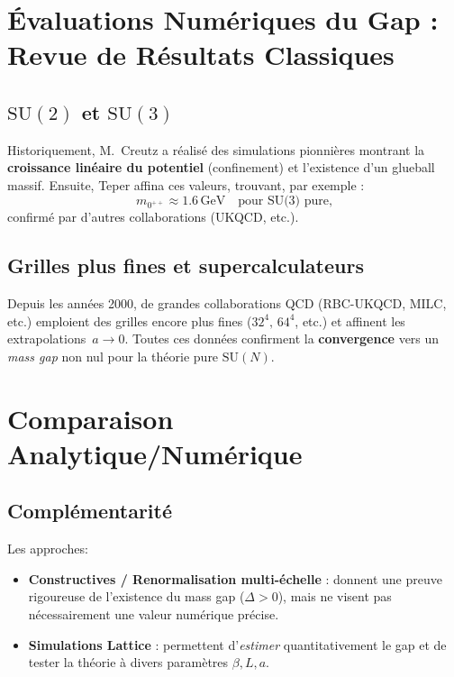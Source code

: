 \section{Évaluations Numériques du Gap : Revue de Résultats Classiques}
\label{sec:C.2}

\subsection*{\(\mathrm{SU}(2)\) et \(\mathrm{SU}(3)\)}
Historiquement, M.~Creutz \cite{Creutz1983} a réalisé des simulations
pionnières montrant la \textbf{croissance linéaire du potentiel} (confinement)
et l’existence d’un glueball massif. Ensuite, Teper \cite{Teper1998} affina
ces valeurs, trouvant, par exemple :
\[
m_{0^{++}} \approx 1.6 \,\mathrm{GeV} \quad \text{pour SU(3) pure,}
\]
confirmé par d’autres collaborations (UKQCD, etc.).

\subsection*{Grilles plus fines et supercalculateurs}
Depuis les années 2000, de grandes collaborations QCD (RBC-UKQCD, MILC, etc.)
emploient des grilles encore plus fines (\(32^4,\,64^4\), etc.) et affinent
les extrapolations \(\,a \to 0\). Toutes ces données confirment la
\textbf{convergence} vers un \emph{mass gap} non nul pour la théorie pure
\(\mathrm{SU}(N)\).

\vspace{1em}

\section{Comparaison Analytique/Numérique}
\label{sec:C.3}

\subsection*{Complémentarité}
Les approches:
\begin{itemize}
	\item \textbf{Constructives / Renormalisation multi-échelle} : donnent une 
	preuve rigoureuse de l’existence du mass gap (\(\Delta>0\)), mais ne visent 
	pas nécessairement une valeur numérique précise.
	\item \textbf{Simulations Lattice} : permettent d’\emph{estimer} quantitativement
	le gap et de tester la théorie à divers paramètres \(\beta, L, a\).  
\end{itemize}

